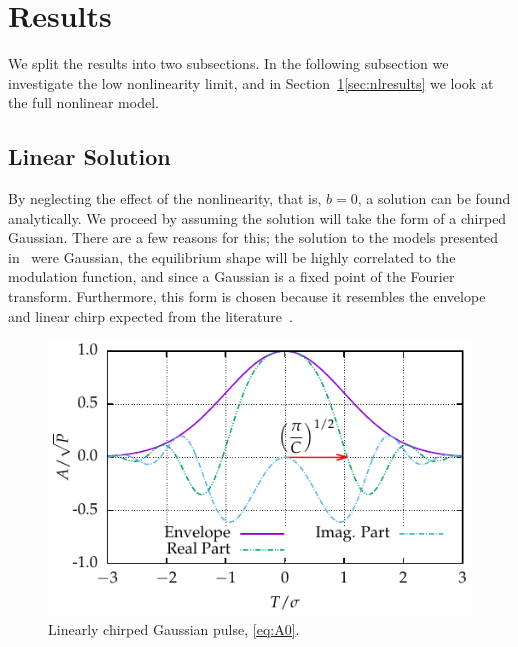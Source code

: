 \documentclass[9pt,twocolumn,twoside]{osajnl}
\begin{document}
\section{Results}
\label{sec:results}
We split the results into two subsections. In the following subsection we investigate the low nonlinearity limit, and in Section~\ref{sec:results}\ref{sec:nlresults} we look at the full nonlinear model.

\subsection{Linear Solution}
By neglecting the effect of the nonlinearity, that is, $b = 0$, a solution can be found analytically. We proceed by assuming the solution will take the form of a chirped Gaussian. There are a few reasons for this; the solution to the models presented in~\cite{cutler1955, siegman1969, kuizenga1970a, martinez1984, martinez1985} were Gaussian, the equilibrium shape will be highly correlated to the modulation function, and since a Gaussian is a fixed point of the Fourier transform. Furthermore, this form is chosen because it resembles the envelope and linear chirp expected from the literature~\cite{burgoyne2014, haus1975, haus1996, haus2000, usechak2005}.

\begin{figure}[tbp]
	\centering
	\includegraphics{Figures/Sample_Gauss}
	\caption{Linearly chirped Gaussian pulse, \eqref{eq:A0}.}
	\label{fig:samplegauss}
\end{figure}
\end{document}
